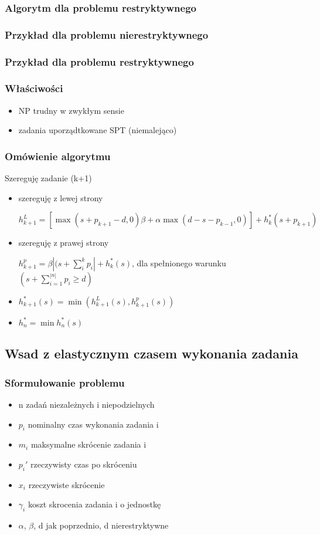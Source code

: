 \documentclass[12pt,a4paper]{article}
\begin{document}
\subsubsection{Algorytm dla problemu restryktywnego}
\subsubsection{Przykład dla problemu nierestryktywnego}
\subsubsection{Przykład dla problemu restryktywnego}
\subsubsection{Właściwości}
\begin{itemize}
\item NP trudny w zwykłym sensie
\item zadania uporządtkowane SPT (niemalejąco)
\end{itemize}
\subsubsection{Omówienie algorytmu}
Szereguję zadanie (k+1)
\begin{itemize}
\item szereguję z lewej strony

$h_{k+1}^{L}=[\max(s+p_{k+1}-d,0)\beta + \alpha\max(d-s-p_{k-1},0)]+h_{k}^{*}(s+p_{k+1})$
\item szereguję z prawej strony

$h_{k+1}^{p}=\beta\left | (s+\sum\limits_{i}^{k}p_{i} \right | +h_{k}^{*}(s)$, dla spełnionego warunku $(s+\sum\limits_{i=1}^{|n|}p_{i}\geq d)$
\item $h_{k+1}^{*}(s)=\min(h_{k+1}^{L}(s), h_{k+1}^{p}(s))$
\item $h_{n}^{*}=\min h_{n}^{*}(s)$
\end{itemize}
\subsection{Wsad z elastycznym czasem wykonania zadania}
\subsubsection{Sformułowanie problemu}
\begin{itemize}
\item n zadań niezależnych i niepodzielnych
\item $p_{i}$ nominalny czas wykonania zadania i
\item $m_{i}$ maksymalne skrócenie zadania i
\item $p_{i}'$ rzeczywisty czas po skróceniu
\item $x_{i}$ rzeczywiste skrócenie
\item $\gamma_{i}$ koszt skrocenia zadania i o jednostkę
\item $\alpha$, $\beta$, d jak poprzednio, d nierestryktywne
\end{itemize}
\end{document}
